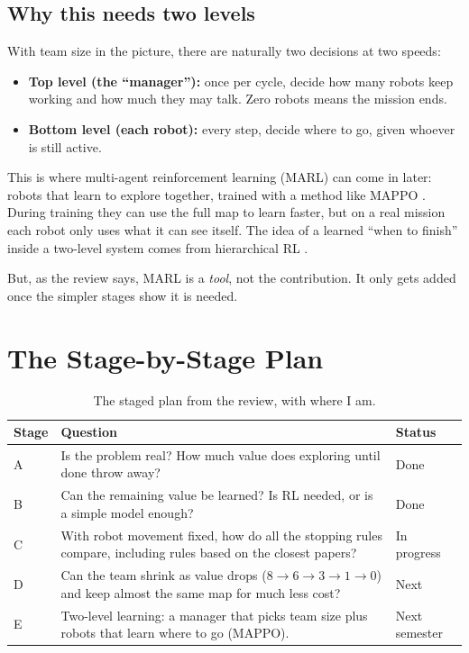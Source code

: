 \documentclass[11pt,a4paper]{article}
\begin{document}
\subsection{Why this needs two levels}

With team size in the picture, there are naturally two decisions at two speeds:
\begin{itemize}
  \item \textbf{Top level (the ``manager''):} once per cycle, decide how many robots keep working and how much they may talk. Zero robots means the mission ends.
  \item \textbf{Bottom level (each robot):} every step, decide where to go, given whoever is still active.
\end{itemize}
This is where multi-agent reinforcement learning (MARL) can come in later: robots that learn to explore together, trained with a method like MAPPO \cite{yu2022mappo}. During training they can use the full map to learn faster, but on a real mission each robot only uses what it can see itself. The idea of a learned ``when to finish'' inside a two-level system comes from hierarchical RL \cite{sutton1999,han2019}.

But, as the review says, MARL is a \emph{tool}, not the contribution. It only gets added once the simpler stages show it is needed.

\section{The Stage-by-Stage Plan}
\label{sec:plan}

\begin{table}[h]
\centering
\small
\begin{tabularx}{\linewidth}{lXl}
\toprule
Stage & Question & Status \\
\midrule
A & Is the problem real? How much value does exploring until done throw away? & Done \\
B & Can the remaining value be learned? Is RL needed, or is a simple model enough? & Done \\
C & With robot movement fixed, how do all the stopping rules compare, including rules based on the closest papers? & In progress \\
D & Can the team shrink as value drops ($8\to6\to3\to1\to0$) and keep almost the same map for much less cost? & Next \\
E & Two-level learning: a manager that picks team size plus robots that learn where to go (MAPPO). & Next semester \\
\bottomrule
\end{tabularx}
\caption{The staged plan from the review, with where I am.}
\end{table}
\end{document}
